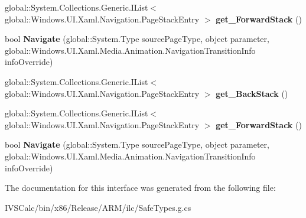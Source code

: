 \begin{DoxyCompactItemize}
global\+::\+System.\+Collections.\+Generic.\+I\+List$<$ global\+::\+Windows.\+U\+I.\+Xaml.\+Navigation.\+Page\+Stack\+Entry $>$ {\bfseries get\+\_\+\+Forward\+Stack} ()
\item 
\mbox{\label{interface_windows_1_1_u_i_1_1_xaml_1_1_controls_1_1_i_frame2_a32261d4af33cf5fe60bbf99cf9aaad33}} 
bool {\bfseries Navigate} (global\+::\+System.\+Type source\+Page\+Type, object parameter, global\+::\+Windows.\+U\+I.\+Xaml.\+Media.\+Animation.\+Navigation\+Transition\+Info info\+Override)
\item 
\mbox{\label{interface_windows_1_1_u_i_1_1_xaml_1_1_controls_1_1_i_frame2_ade8b031cab9ada8cf6038a885fabfe5c}} 
global\+::\+System.\+Collections.\+Generic.\+I\+List$<$ global\+::\+Windows.\+U\+I.\+Xaml.\+Navigation.\+Page\+Stack\+Entry $>$ {\bfseries get\+\_\+\+Back\+Stack} ()
\item 
\mbox{\label{interface_windows_1_1_u_i_1_1_xaml_1_1_controls_1_1_i_frame2_a49daee7f2dba9da8ec0551c2b9170002}} 
global\+::\+System.\+Collections.\+Generic.\+I\+List$<$ global\+::\+Windows.\+U\+I.\+Xaml.\+Navigation.\+Page\+Stack\+Entry $>$ {\bfseries get\+\_\+\+Forward\+Stack} ()
\item 
\mbox{\label{interface_windows_1_1_u_i_1_1_xaml_1_1_controls_1_1_i_frame2_a32261d4af33cf5fe60bbf99cf9aaad33}} 
bool {\bfseries Navigate} (global\+::\+System.\+Type source\+Page\+Type, object parameter, global\+::\+Windows.\+U\+I.\+Xaml.\+Media.\+Animation.\+Navigation\+Transition\+Info info\+Override)
\end{DoxyCompactItemize}


The documentation for this interface was generated from the following file\+:\begin{DoxyCompactItemize}
\item 
I\+V\+S\+Calc/bin/x86/\+Release/\+A\+R\+M/ilc/Safe\+Types.\+g.\+cs\end{DoxyCompactItemize}
